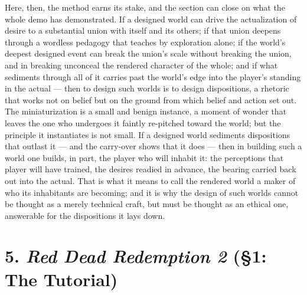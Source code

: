 \documentclass{article}
\begin{document}
Here, then, the method earns its stake, and the section can close on what the whole demo has demonstrated. If a designed world can drive the actualization of desire to a substantial union with itself and its others; if that union deepens through a wordless pedagogy that teaches by exploration alone; if the world's deepest designed event can break the union's scale without breaking the union, and in breaking unconceal the rendered character of the whole; and if what sediments through all of it carries past the world's edge into the player's standing in the actual — then to design such worlds is to design dispositions, a rhetoric that works not on belief but on the ground from which belief and action set out. The miniaturization is a small and benign instance, a moment of wonder that leaves the one who undergoes it faintly re-pitched toward the world; but the principle it instantiates is not small. If a designed world sediments dispositions that outlast it — and the carry-over shows that it does — then in building such a world one builds, in part, the player who will inhabit it: the perceptions that player will have trained, the desires readied in advance, the bearing carried back out into the actual. That is what it means to call the rendered world a maker of who its inhabitants are becoming; and it is why the design of such worlds cannot be thought as a merely technical craft, but must be thought as an ethical one, answerable for the dispositions it lays down.

\bigskip

\section*{5. \textit{Red Dead Redemption 2} (§1: The Tutorial)}

\end{document}
